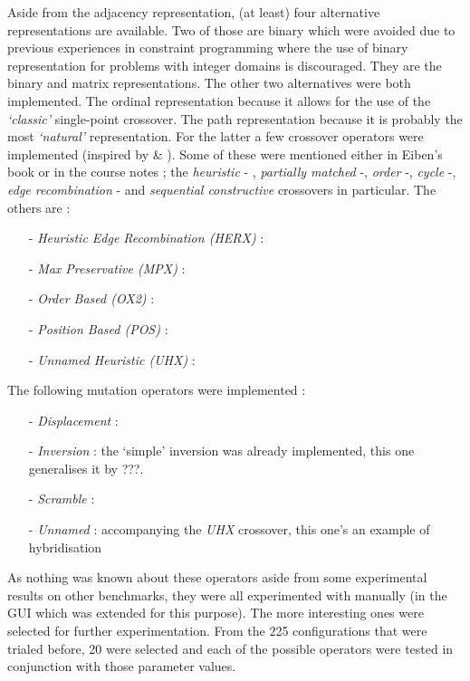 
Aside from the adjacency representation, (at least) four alternative representations are available. Two of those are binary which were avoided due to previous experiences in constraint programming where the use of binary representation for problems with integer domains is discouraged. They are the binary and matrix representations. The other two alternatives were both implemented. The ordinal representation because it allows for the use of the \textit{`classic'} single-point crossover. The path representation because it is probably the most \textit{`natural'} representation. For the latter a few crossover operators were implemented (inspired by \cite{larraaga} \& \cite{imskhan}). Some of these were mentioned either in Eiben's book or in the course notes ; the \textit{heuristic} - , \textit{partially matched} -, \textit{order} -, \textit{cycle} -, \textit{edge recombination} - and \textit{sequential constructive} crossovers in particular. The others are : 
\begin{itemize}
\item[-] \textit{Heuristic Edge Recombination (HERX)} : 
\item[-] \textit{Max Preservative (MPX)} : 
\item[-] \textit{Order Based (OX2)} : 
\item[-] \textit{Position Based (POS)} : 
\item[-] \textit{Unnamed Heuristic (UHX)} : 
\end{itemize}
The following mutation operators were implemented :
\begin{itemize}
\item[-] \textit{Displacement} : 
\item[-] \textit{Inversion} : the `simple' inversion was already implemented, this one generalises it by ???.
\item[-] \textit{Scramble} : 
\item[-] \textit{Unnamed} : accompanying the \textit{UHX} crossover, this one's an example of hybridisation
\end{itemize}
As nothing was known about these operators aside from some experimental results on other benchmarks, they were all experimented with manually (in the GUI which was extended for this purpose). The more interesting ones were selected for further experimentation. From the 225 configurations that were trialed before, 20 were selected and each of the possible operators were tested in conjunction with those parameter values.\\

